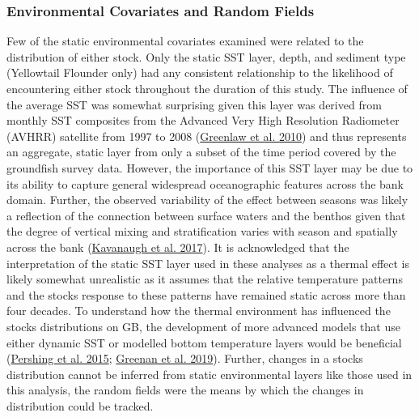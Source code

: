 \documentclass[
]{article}
\begin{document}
\hypertarget{environmental-covariates-and-random-fields}{%
\subsubsection{Environmental Covariates and Random Fields}\label{environmental-covariates-and-random-fields}}

Few of the static environmental covariates examined were related to the distribution of either stock. Only the static SST layer, depth, and sediment type (Yellowtail Flounder only) had any consistent relationship to the likelihood of encountering either stock throughout the duration of this study. The influence of the average SST was somewhat surprising given this layer was derived from monthly SST composites from the Advanced Very High Resolution Radiometer (AVHRR) satellite from 1997 to 2008 (\protect\hyperlink{ref-greenlawGeodatabaseHistoricalContemporary2010}{Greenlaw et al. 2010}) and thus represents an aggregate, static layer from only a subset of the time period covered by the groundfish survey data. However, the importance of this SST layer may be due to its ability to capture general widespread oceanographic features across the bank domain. Further, the observed variability of the effect between seasons was likely a reflection of the connection between surface waters and the benthos given that the degree of vertical mixing and stratification varies with season and spatially across the bank (\protect\hyperlink{ref-kavanaughThirtyThreeYearsOcean2017}{Kavanaugh et al. 2017}). It is acknowledged that the interpretation of the static SST layer used in these analyses as a thermal effect is likely somewhat unrealistic as it assumes that the relative temperature patterns and the stocks response to these patterns have remained static across more than four decades. To understand how the thermal environment has influenced the stocks distributions on GB, the development of more advanced models that use either dynamic SST or modelled bottom temperature layers would be beneficial (\protect\hyperlink{ref-pershingSlowAdaptationFace2015}{Pershing et al. 2015}; \protect\hyperlink{ref-greenanClimateChangeVulnerability2019}{Greenan et al. 2019}). Further, changes in a stocks distribution cannot be inferred from static environmental layers like those used in this analysis, the random fields were the means by which the changes in distribution could be tracked.
\end{document}
